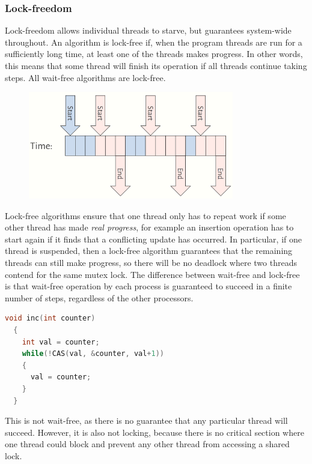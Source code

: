 \documentclass[CS4204-Notes.tex]{subfiles}
\begin{document}
\subsubsection{Lock-freedom}
Lock-freedom allows individual threads to starve, but guarantees system-wide throughout. An algorithm is lock-free if, when the program threads are run for a sufficiently long time, at least one of the threads makes progress. In other words, this means that some thread will finish its operation if all threads continue taking steps. All wait-free algorithms are lock-free.
\begin{figure}[H]
  \centering
  \includegraphics[width=0.8\textwidth, keepaspectratio]{imgs/lock-free.png}
\end{figure}
\noindent
Lock-free algorithms ensure that one thread only has to repeat work if some other thread has made \textit{real progress}, for example an insertion operation has to start again if it finds that a conflicting update has occurred. In particular, if one thread is suspended, then a lock-free algorithm guarantees that the remaining threads can still make progress, so there will be no deadlock where two threads contend for the same mutex lock. The difference between wait-free and lock-free is that wait-free operation by each process is guaranteed to succeed in a finite number of steps, regardless of the other processors.
\begin{lstlisting}[caption={Lock-free algorithm to increment a counter}, language=C]
  void inc(int counter)
  {
    int val = counter;
    while(!CAS(val, &counter, val+1))
    {
      val = counter;
    }
  }
\end{lstlisting}
This is not wait-free, as there is no guarantee that any particular thread will succeed. However, it is also not locking, because there is no critical section where one thread could block and prevent any other thread from accessing a shared lock.
\end{document}
